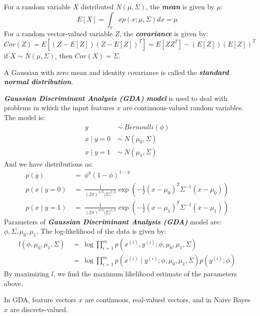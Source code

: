 \documentclass{article}
\begin{document}
For a random variable $X$ distributed $N(\mu, \Sigma)$, the \emph{\textbf{mean}} is given by $\mu$:
\begin{equation*}
E[X]=\int_x xp(x;\mu,\Sigma)dx=\mu
\end{equation*}
For a random vector-valued variable $Z$, the \emph{\textbf{covariance}} is given by:
\begin{equation*}
Cov(Z)=E[(Z-E[Z])(Z-E[Z])^T]=E[ZZ^T]-(E[Z])(E[Z])^T
\end{equation*}
if $X\sim N(\mu,\Sigma)$, then $Cov(X)=\Sigma$.

A Gaussian with zero mean and identity covariance is called the \emph{\textbf{standard normal distribution}}.

\emph{\textbf{Gaussian Discriminant Analysis (GDA) model}} is used to deal with problems in which the input features $x$ are continuous-valued random variables.
The model is:
\begin{align*}
y\ &\sim\ Bernoulli(\phi) \\
x\mid y=0\ &\sim\ N(\mu_0,\Sigma) \\
x\mid y=1\ &\sim\ N(\mu_1,\Sigma) 
\end{align*}
And we have distributions as:
\begin{align*}
p(y)\ &=\ \phi^y(1-\phi)^{1-y} \\
p(x\mid y=0)\ &=\ \frac{1}{(2\pi)^{n/2}\lvert\Sigma\rvert^{1/2}}\exp\left(-\frac{1}{2}(x-\mu_0)^T\Sigma^{-1}(x-\mu_0)\right) \\
p(x\mid y=1)\ &=\ \frac{1}{(2\pi)^{n/2}\lvert\Sigma\rvert^{1/2}}\exp\left(-\frac{1}{2}(x-\mu_1)^T\Sigma^{-1}(x-\mu_1)\right)
\end{align*}
Parameters of \emph{\textbf{Gaussian Discriminant Analysis (GDA)}} model are: \\ 
$\phi, \Sigma, \mu_0, \mu_1$.
The log-likelihood of the data is given by:
\begin{align*}
l(\phi, \mu_0, \mu_1, \Sigma)\ &=\ \log\prod_{i=1}^mp(x^{(i)},y^{(i)};\phi,\mu_0,\mu_1,\Sigma) \\
                               &=\ \log\prod_{i=1}^mp(x^{(i)}\mid y^{(i)};\phi,\mu_0,\mu_1,\Sigma)p(y^{(i)};\phi)
\end{align*}
By maximizing $l$, we find the maximum likelihood estimate of the parameters above.

\begin{spacing}{2}
\end{spacing}

In GDA, feature vectors $x$ are continuous, real-valued vectors, and in Naive Bayes $x$ are discrete-valued.
\end{document}
